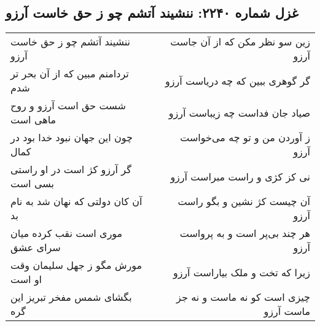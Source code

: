\begin{center}
\section*{غزل شماره ۲۲۴۰: ننشیند آتشم چو ز حق خاست آرزو}
\label{sec:2240}
\begin{longtable}{l p{0.5cm} r}
ننشیند آتشم چو ز حق خاست آرزو
&&
زین سو نظر مکن که از آن جاست آرزو
\\
تردامنم مبین که از آن بحر تر شدم
&&
گر گوهری ببین که چه دریاست آرزو
\\
شست حق است آرزو و روح ماهی است
&&
صیاد جان فداست چه زیباست آرزو
\\
چون این جهان نبود خدا بود در کمال
&&
ز آوردن من و تو چه می‌خواست آرزو
\\
گر آرزو کژ است در او راستی بسی است
&&
نی کز کژی و راست مبراست آرزو
\\
آن کان دولتی که نهان شد به نام بد
&&
آن چیست کژ نشین و بگو راست آرزو
\\
موری است نقب کرده میان سرای عشق
&&
هر چند بی‌پر است و به پرواست آرزو
\\
مورش مگو ز جهل سلیمان وقت او است
&&
زیرا که تخت و ملک بیاراست آرزو
\\
بگشای شمس مفخر تبریز این گره
&&
چیزی است کو نه ماست و نه جز ماست آرزو
\\
\end{longtable}
\end{center}
